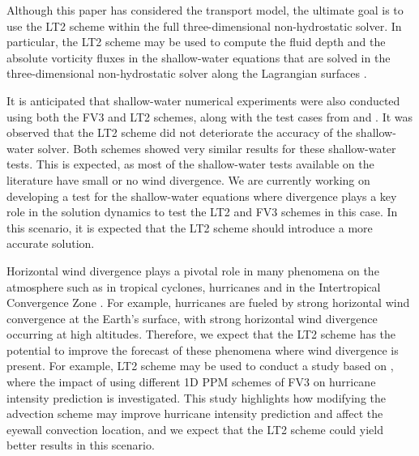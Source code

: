 \documentclass[preprint,12pt]{elsarticle}
\begin{document}
\begin{linenumbers}



Although this paper has considered the transport model, the ultimate goal is to use the LT2 scheme within the full three-dimensional non-hydrostatic solver. 
In particular, the LT2 scheme may be used to compute the fluid depth and the absolute vorticity fluxes in the shallow-water equations that are solved in the three-dimensional non-hydrostatic solver along the Lagrangian surfaces \cite{lin:2004}.

It is anticipated that shallow-water numerical experiments were also conducted using both the FV3 and LT2 schemes, along with the test cases from \cite{will:1992} and \cite{galewsky:2004}. It was observed that the LT2 scheme did not deteriorate the accuracy of the shallow-water solver. 
Both schemes showed very similar results for these shallow-water tests.
This is expected, as most of the shallow-water tests available on the literature have small or no wind divergence.
We are currently working on developing a test for the shallow-water equations where divergence plays a key role in the solution dynamics to test the LT2 and FV3 schemes in this case.
In this scenario, it is expected that the LT2 scheme should introduce a more accurate solution.

Horizontal wind divergence plays a pivotal role in many phenomena on the atmosphere such as in tropical cyclones, hurricanes and in the Intertropical Convergence Zone \cite{holton:2012}.
For example, hurricanes are fueled by strong horizontal wind convergence at the Earth’s surface, with strong horizontal wind divergence occurring at high altitudes.
Therefore, we expect that the LT2 scheme has the potential to improve the forecast of these phenomena where wind divergence is present.
For example, LT2 scheme may be used to conduct a study based on \cite{gao:2021}, where the impact of using different 1D PPM schemes of FV3 on hurricane intensity prediction is investigated. 
This study highlights how modifying the advection scheme may improve hurricane intensity prediction and affect the eyewall convection location, and we expect that the LT2 scheme could yield better results in this scenario.



\end{linenumbers}
\end{document}
